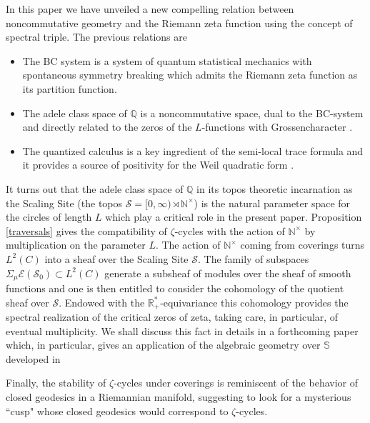 \documentclass[cupthm]{CUP-JNL-JMJ}
\def\N{{\mathbb N}}
\def\Q{{\mathbb Q}}
\def\R{{\mathbb R}}
\def\cE{{\mathcal E}}
\def\cS{{\mathcal S}}
\def\nt{{\N^{\times}}}
\def\scal2{{\mathscr S}}
\def\nt{{\N^{\times}}}
\numberwithin{equation}{section}
\theoremstyle{cupplain}
\theoremstyle{cupdefinition}
\theoremstyle{cupremark}
\theoremstyle{cupproof}
\begin{document}
In this paper we have unveiled a new compelling  relation between noncommutative geometry and 
the Riemann zeta function using the concept of spectral triple. The previous relations are
 \begin{itemize}
\item The BC system is a system of quantum statistical mechanics with spontaneous symmetry breaking which admits the Riemann zeta function as its partition function.
\item The  adele class space of $\Q$ is a noncommutative space, dual to the BC-system and directly related to the zeros of the $L$-functions with Grossencharacter \cite{Co-zeta}. 
\item The quantized calculus is a key ingredient of the semi-local trace formula and it provides  a source of positivity for the Weil quadratic form \cite{weilpos}.	
\end{itemize}
It turns out that the adele class space of $\Q$ in its topos theoretic incarnation as the Scaling Site  (the topos $\scal2=[0,\infty) \rtimes \nt$) is the natural parameter space for the circles of length $L$ which play a critical role in the present paper. Proposition \ref{traversals} gives the compatibility of $\zeta$-cycles with the action of $\nt$ by multiplication on the parameter $L$. The action of $\nt$ coming from coverings turns $L^2(C)$ into a sheaf over the Scaling Site $\scal2$. The family of subspaces $\Sigma_\mu \cE(\cS_0)\subset L^2(C)$ generate a subsheaf of  modules over the sheaf of smooth functions and one is then entitled to  consider the cohomology of the  quotient sheaf over $\scal2$.  Endowed with the $\R_+^*$-equivariance this cohomology provides the spectral realization of the critical zeros of zeta, taking care, in particular, of eventual  multiplicity. We shall discuss this fact in details in a forthcoming paper which, in particular, gives an application of the algebraic geometry over $\mathbb S$ developed in \cite{mothers}

Finally, the stability of $\zeta$-cycles under coverings is  reminiscent of the behavior of closed geodesics in a Riemannian manifold, suggesting to look for a mysterious ``cusp" whose closed geodesics would correspond to  $\zeta$-cycles.
\end{document}
